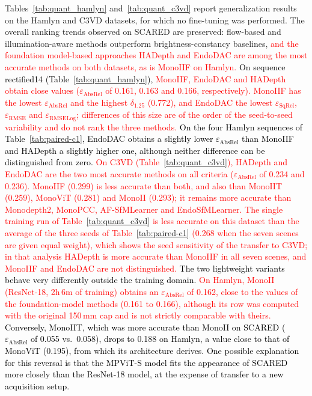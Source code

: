 \documentclass[a4paper,fleqn]{cas-dc}
\begin{document}
{Tables~\ref{tab:quant_hamlyn} and~\ref{tab:quant_c3vd} report generalization results on the Hamlyn and C3VD datasets, for which no fine-tuning was performed. The overall ranking trends observed on SCARED are preserved: flow-based and illumination-aware methods outperform brightness-constancy baselines, \textcolor{red}{and the foundation model-based approaches HADepth and EndoDAC are among the most accurate methods on both datasets, as is MonoIIF on Hamlyn.} 
\textcolor{black}{On sequence rectified14 (Table~\ref{tab:quant_hamlyn}),} \textcolor{red}{MonoIIF, EndoDAC and HADepth obtain close values ($\varepsilon_\textrm{AbsRel}$ of 0.161, 0.163 and 0.166, respectively). MonoIIF has the lowest $\varepsilon_\textrm{AbsRel}$ and the highest $\delta_{1.25}$ (0.772), and EndoDAC the lowest $\varepsilon_\textrm{SqRel}$, $\varepsilon_\textrm{RMSE}$ and $\varepsilon_\textrm{RMSELog}$; differences of this size are of the order of the seed-to-seed variability and do not rank the three methods.} \textcolor{black}{ On the four Hamlyn sequences of Table~\ref{tab:paired-c1}, EndoDAC obtains a slightly lower $\varepsilon_\textrm{AbsRel}$ than MonoIIF and HADepth a slightly higher one, although neither difference can be distinguished from zero.
\textcolor{red}{On C3VD (Table~\ref{tab:quant_c3vd}), HADepth and EndoDAC are the two most accurate methods on all criteria ($\varepsilon_\textrm{AbsRel}$ of 0.234 and 0.236). MonoIIF (0.299) is less accurate than both, and also than MonoIIT (0.259), MonoViT (0.281) and MonoII (0.293); it remains more accurate than Monodepth2, MonoPCC, AF-SfMLearner and EndoSfMLearner. The single training run of Table~\ref{tab:quant_c3vd} is less accurate on this dataset than the average of the three seeds of Table~\ref{tab:paired-c1} (0.268 when the seven scenes are given equal weight), which shows the seed sensitivity of the transfer to C3VD; in that analysis HADepth is more accurate than MonoIIF in all seven scenes, and MonoIIF and EndoDAC are not distinguished.}}
\textcolor{black}
{
The two lightweight variants behave very differently outside the training domain. \textcolor{red}{On Hamlyn, MonoII (ResNet-18, 2h\,6m of training) obtains an $\varepsilon_\textrm{AbsRel}$ of 0.162, close to the values of the foundation-model methods (0.161 to 0.166), although its row was computed with the original 150\,mm cap and is not strictly comparable with theirs.} Conversely, MonoIIT, which was more accurate than MonoII on SCARED ($\varepsilon_\textrm{AbsRel}$ of 0.055 vs.\ 0.058), drops to 0.188 on Hamlyn, a value close to that of MonoViT (0.195), from which its architecture derives. One possible explanation for this reversal is that the MPViT-S model fits the appearance of SCARED more closely than the ResNet-18 model, at the expense of transfer to a new acquisition setup.
}}
\end{document}
